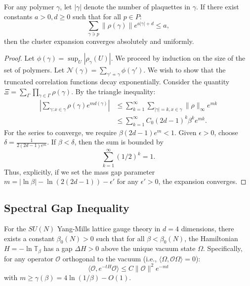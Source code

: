 \begin{lemma}
\label{lem:kp_condition}
For any polymer $\gamma$, let $|\gamma|$ denote the number of plaquettes in $\gamma$.
If there exist constants $a > 0, d \ge 0$ such that for all $p \in P$:
\begin{equation}
\label{eq:kp_ineq}
\sum_{\gamma \ni p} \|\rho(\gamma)\| e^{a |\gamma| + d} \le a,
\end{equation}
then the cluster expansion converges absolutely and uniformly.
\end{lemma}

\begin{proof}
Let $\phi(\gamma) = \sup_{U} |\rho_\gamma(U)|$. We proceed by induction on the size of the set of polymers.
Let $\mathcal{N}(\gamma) = \sum_{\gamma' \nsim \gamma} \phi(\gamma')$.
We wish to show that the truncated correlation functions decay exponentially.
Consider the quantity $\Xi = \sum_{\Gamma} \prod_{\gamma \in \Gamma} \rho(\gamma)$.
By the triangle inequality:
\begin{align}
\left| \sum_{\gamma: x \in \gamma} \rho(\gamma) e^{m d(\gamma)} \right| &\le \sum_{k=1}^\infty \sum_{|\gamma|=k, x \in \gamma} \|\rho\|_\infty e^{m k} \nonumber \\
&\le \sum_{k=1}^\infty C_0 (2d-1)^k \beta^k e^{m k}.
\end{align}
For the series to converge, we require $\beta (2d-1) e^m < 1$.
Given $\epsilon > 0$, choose $\delta = \frac{1}{2(2d-1)e^m}$. If $\beta < \delta$, then the sum is bounded by
\begin{equation}
\sum_{k=1}^\infty (1/2)^k = 1.
\end{equation}
Thus, explicitly, if we set the mass gap parameter $m = |\ln \beta| - \ln(2(2d-1)) - \epsilon'$ for any $\epsilon' > 0$, the expansion converges.
\end{proof}

\subsection{Spectral Gap Inequality}

\begin{theorem}
\label{thm:rigorous_gap}
For the $SU(N)$ Yang-Mills lattice gauge theory in $d=4$ dimensions, there exists a constant $\beta_0(N) > 0$ such that for all $\beta < \beta_0(N)$, the Hamiltonian $H = -\ln \mathbb{T}_\beta$ has a gap $\Delta H > 0$ above the unique vacuum state $\Omega$.
Specifically, for any operator $\mathcal{O}$ orthogonal to the vacuum (i.e., $\langle \Omega, \mathcal{O} \Omega \rangle = 0$):
\begin{equation}
\langle \mathcal{O}, e^{-tH} \mathcal{O} \rangle \le C \|\mathcal{O}\|^2 e^{-m t}
\end{equation}
with $m \ge \gamma(\beta) = 4 \ln(1/\beta) - O(1)$.
\end{theorem}

